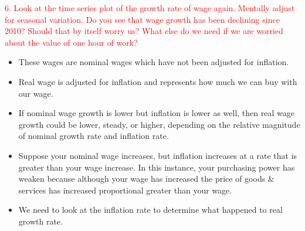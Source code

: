 \documentclass[12pt]{report}
\begin{document}
\noindent \textcolor{red}{6. Look at the time series plot of the growth rate of wage again. Mentally adjust for seasonal variation. Do you see that wage growth has been declining since 2010? Should that by itself worry us? What else do we need if we are worried about the value of one hour of work?}
\begin{itemize}
	\item These wages are nominal wages which have not been adjusted for inflation.
	\item Real wage is adjusted for inflation and represents how much we can buy with our wage.
	\item If nominal wage growth is lower but inflation is lower as well, then real wage growth could be lower, steady, or higher, depending on the relative magnitude of nominal growth rate and inflation rate.
	\item  Suppose your nominal wage increases, but inflation increases at a rate that is greater than your wage increase. In this instance, your purchasing power has weaken because although your wage has increased the price of goods \& services has increased proportional greater than your wage. 
	\item We need to look at the inflation rate to determine what happened to real growth rate.
\end{itemize}
\end{document}
